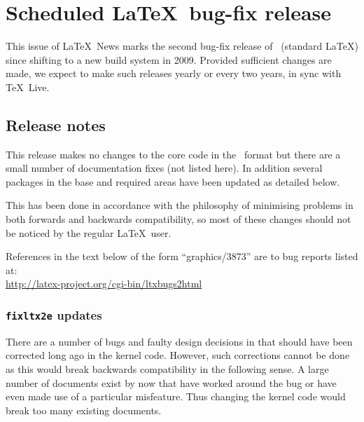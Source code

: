 \documentclass{ltnews}
\providecommand\pkg[1]{\texttt{#1}}
\begin{document}
\maketitle

\section{Scheduled \LaTeX\ bug-fix release}

This issue of \LaTeX~News marks the second bug-fix release of
\LaTeXe\ (standard \LaTeX) since shifting to a new build system in 2009.
Provided sufficient changes are made, we expect to
make such releases yearly or every two years, in sync with \TeX\ Live.



\subsection{Release notes}

This release makes no changes to the core code in the \LaTeXe\ format
but there are a small number of documentation fixes (not listed
here). In addition several packages in the \textsf{base} and
\textsf{required} areas have been updated as detailed below.


This has been done in accordance with the philosophy of minimising
problems in both forwards and backwards compatibility, so most of
these changes should not be noticed by the regular \LaTeX\ user.

References in the text below of the form ``graphics/3873'' are to
bug reports listed
at:\\ \url{http://latex-project.org/cgi-bin/ltxbugs2html}


\let\paragraph\subsubsection

\paragraph{\pkg{fixltx2e} updates}



There are a number of bugs and faulty design decisions in \LaTeXe{}
that should have been corrected long ago in the kernel code.  However,
such corrections cannot be done as this would break backwards
compatibility in the following sense. A large number of documents
exist by now that have worked around the bug or have even made use of
a particular misfeature.  Thus changing the kernel code would break
too many existing documents.
\end{document}
